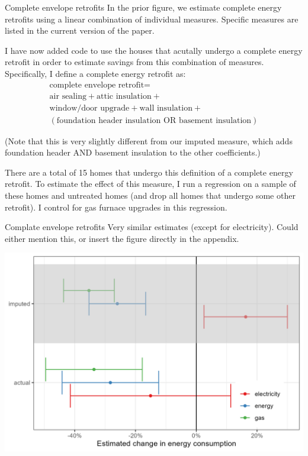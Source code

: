 \documentclass[8pt]{beamer}
\begin{document}
\begin{frame}{Complete envelope retrofits}
	In the prior figure, we estimate complete energy retrofits using a linear combination of individual measures. Specific measures are listed in the current version of the paper.
	
	I have now added code to use the houses that acutally undergo a complete energy retrofit in order to estimate savings from this combination of measures.  Specifically, I define a complete energy retrofit as:
	\begin{align*}
		\text{complete envelope retrofit} = \\
		\text{air sealing} +
		\text{attic insulation} + \\
		\text{window/door upgrade} +
		\text{wall insulation} + \\
		(\text{foundation header insulation} \text{ OR } \text{basement insulation})
	\end{align*}

	(Note that this is very slightly different from our imputed measure, which adds foundation header AND basement insulation to the other coefficients.)

	There are a total of 15 homes that undergo this definition of a complete energy retrofit. To estimate the effect of this measure, I run a regression on a sample of these homes and untreated homes (and drop all homes that undergo some other retrofit). I control for gas furnace upgrades in this regression.
\end{frame}

\begin{frame}{Complate envelope retrofits}
	Very similar estimates (except for electricity). Could either mention this, or insert the figure directly in the appendix.
	
	\includegraphics[width=\linewidth]{../output_figures_tables/cer_energy_savings}
\end{frame}
\end{document}
